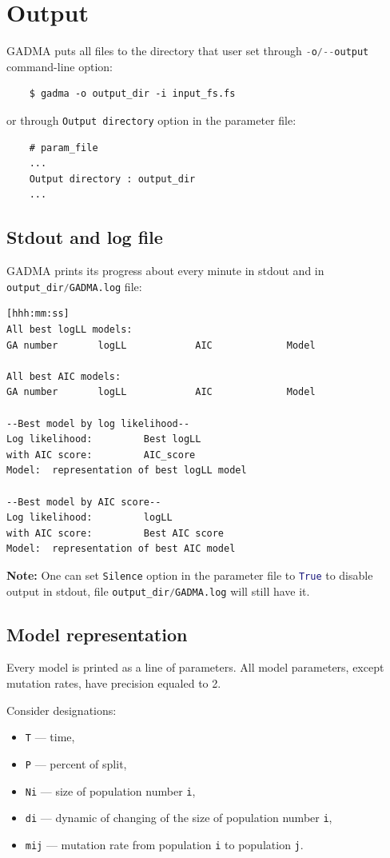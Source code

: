 \documentclass[12pt]{article}
\makeatletter
\newcommand{\py}[1]{\lstinline[language=Python, showstringspaces=False]@#1@}
\makeatother
\begin{document}
\section{Output}
GADMA puts all files to the directory that user set through \py{-o/--output} command-line option:
    \begin{lstlisting}
    $ gadma -o output_dir -i input_fs.fs
    \end{lstlisting}
or through \py{Output directory} option in the parameter file:
    \begin{lstlisting}
    # param_file
    ...
    Output directory : output_dir
    ...
    \end{lstlisting}

\subsection{Stdout and log file}
GADMA prints its progress about every minute in stdout and in \py{output_dir/GADMA.log} file:

\begin{lstlisting}
[hhh:mm:ss]
All best logLL models:
GA number       logLL            AIC             Model

All best AIC models:
GA number       logLL            AIC             Model

--Best model by log likelihood--
Log likelihood:       	Best logLL
with AIC score:         AIC_score
Model: 	representation of best logLL model

--Best model by AIC score--
Log likelihood:       	logLL
with AIC score:         Best AIC score
Model:  representation of best AIC model 
\end{lstlisting}
 
\textbf{Note:} One can set \py{Silence} option in the parameter file to \py{True} to disable output in stdout, file \py{output_dir/GADMA.log} will still have it.

\subsection{Model representation}
Every model is printed as a line of parameters. All model parameters, except mutation rates, have precision equaled to 2.

Consider designations:
\begin{itemize}
    \item \py{T} --- time,
    \item \py{P} --- percent of split,
    \item \py{Ni} --- size of population number \py{i},
    \item \py{di} --- dynamic of changing of the size of population number \py{i},
    \item \py{mij} --- mutation rate from population \py{i} to population \py{j}.
\end{itemize}
\end{document}

